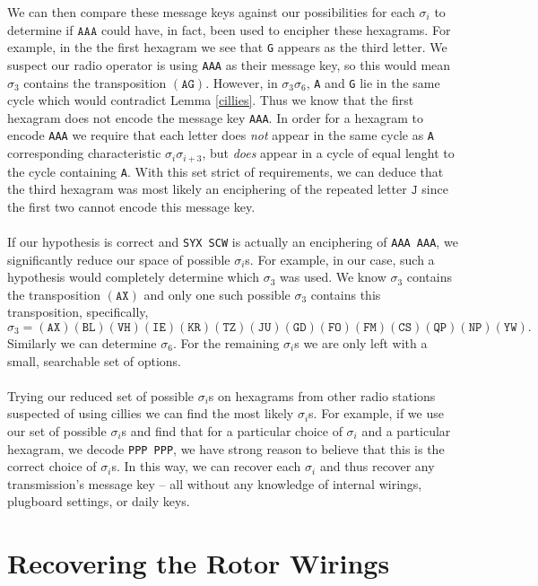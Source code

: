 \noindent We can then compare these message keys against our
possibilities for each
$\sigma_i$ to determine if $\texttt{AAA}$ could have, in fact, been
used to encipher these hexagrams. For example, in the the first
hexagram we see that \texttt{G} appears as the third letter. We
suspect our radio operator is using \texttt{AAA} as their message
key, so this would mean $\sigma_3$ contains the transposition
$(\texttt{AG})$. However, in $\sigma_3\sigma_6$, \texttt{A} and
\texttt{G} lie in the
same cycle which would contradict Lemma
\ref{cillies}. Thus we know that the first hexagram does not encode
the message key \texttt{AAA}. In order for a hexagram to encode
\texttt{AAA} we require that each letter does \emph{not} appear in
the same cycle as \texttt{A} corresponding characteristic
$\sigma_i\sigma_{i+3}$, but \emph{does} appear in a cycle of equal
lenght to the cycle containing \texttt{A}. With this set strict of
requirements, we can deduce that the
third hexagram was most likely an enciphering of the repeated letter
$\texttt{J}$ since the first two cannot encode this message key.
\\\\If our hypothesis is correct and \texttt{SYX SCW} is actually an
enciphering of \texttt{AAA AAA}, we significantly reduce our space of
possible $\sigma_i$s. For example, in our case, such a
hypothesis would completely determine which $\sigma_3$ was used. We
know $\sigma_3$ contains the transposition $(\texttt{AX})$ and only
one such possible $\sigma_3$ contains this transposition, specifically,
\[
  \sigma_3 =
  (\texttt{AX})(\texttt{BL})(\texttt{VH})(\texttt{IE})(\texttt{KR})(\texttt{TZ})(\texttt{JU})(\texttt{GD})(\texttt{FO})(\texttt{FM})(\texttt{CS})(\texttt{QP})(\texttt{NP})(\texttt{YW}).
\]Similarly we can determine $\sigma_6$.
For the remaining $\sigma_i$s we are only left
with a small, searchable set of options.
\\\\Trying our reduced set of possible $\sigma_i$s on hexagrams from
other radio stations
suspected of using cillies we can find the most likely $\sigma_i$s.
For example, if we use our set of possible $\sigma_i$s and find that
for a particular choice of $\sigma_i$ and a particular hexagram, we
decode \texttt{PPP PPP}, we have strong reason to believe that this
is the correct choice of $\sigma_i$s.
In this way, we can recover each $\sigma_i$ and thus recover any
transmission's message key -- all without any knowledge of internal
wirings, plugboard settings, or daily keys.
\section{Recovering the Rotor Wirings}

